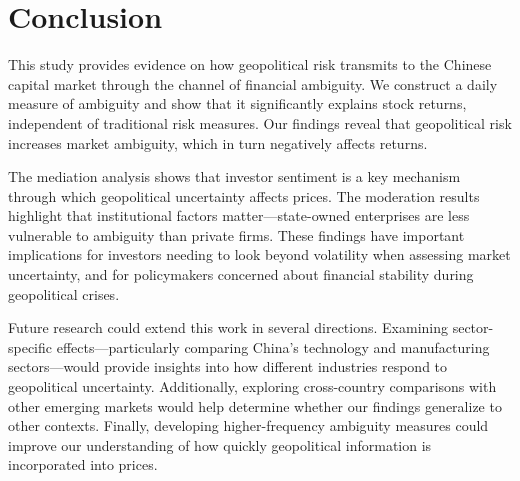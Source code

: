 \documentclass[12pt]{article}
\begin{document}
\section{Conclusion}

This study provides evidence on how geopolitical risk transmits to the Chinese capital market through the channel of financial ambiguity. We construct a daily measure of ambiguity and show that it significantly explains stock returns, independent of traditional risk measures. Our findings reveal that geopolitical risk increases market ambiguity, which in turn negatively affects returns.

The mediation analysis shows that investor sentiment is a key mechanism through which geopolitical uncertainty affects prices. The moderation results highlight that institutional factors matter—state-owned enterprises are less vulnerable to ambiguity than private firms. These findings have important implications for investors needing to look beyond volatility when assessing market uncertainty, and for policymakers concerned about financial stability during geopolitical crises.

Future research could extend this work in several directions. Examining sector-specific effects—particularly comparing China's technology and manufacturing sectors—would provide insights into how different industries respond to geopolitical uncertainty. Additionally, exploring cross-country comparisons with other emerging markets would help determine whether our findings generalize to other contexts. Finally, developing higher-frequency ambiguity measures could improve our understanding of how quickly geopolitical information is incorporated into prices.



\end{document}
